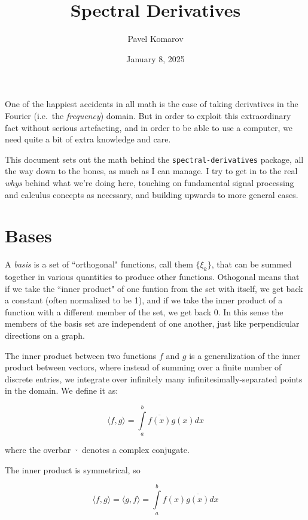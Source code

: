 \documentclass[10pt]{article}
\begin{document}
\allowdisplaybreaks

\title{Spectral Derivatives}
\author{Pavel Komarov}
\date{January 8, 2025}
\maketitle

One of the happiest accidents in all math is the ease of taking derivatives in the Fourier (i.e.~the \textit{frequency}) domain. But in order to exploit this extraordinary fact without serious artefacting, and in order to be able to use a computer, we need quite a bit of extra knowledge and care.

This document sets out the math behind the \texttt{spectral-derivatives} package, all the way down to the bones, as much as I can manage. I try to get in to the real \textit{whys} behind what we're doing here, touching on fundamental signal processing and calculus concepts as necessary, and building upwards to more general cases.

\tableofcontents
\pagebreak

\section{Bases}

A \textit{basis} is a set of ``orthogonal" functions, call them $\{\xi_k\}$, that can be summed together in various quantities to produce other functions. Othogonal means that if we take the ``inner product" of one funtion from the set with itself, we get back a constant (often normalized to be 1), and if we take the inner product of a function with a different member of the set, we get back 0. In this sense the members of the basis set are independent of one another, just like perpendicular directions on a graph.

The inner product between two functions $f$ and $g$ is a generalization of the inner product between vectors, where instead of summing over a finite number of discrete entries, we integrate over infinitely many infinitesimally-separated points in the domain. We define it as:

$$ \langle f,g \rangle = \int\limits_{a}^{b} \overline{f(x)} g(x) dx $$

where the overbar $\overline{\cdot}$ denotes a complex conjugate.\newline

The inner product is symmetrical, so

$$ \langle f,g \rangle = \langle g,f \rangle = \int\limits_{a}^{b} f(x) \overline{g(x)} dx $$
\end{document}
